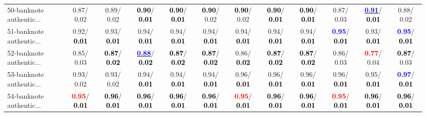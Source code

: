 \begin{table}[h]
\begin{center}
{\begin{tabular}{lc|c|c|c|c|c|c|c|c|c|c}
50-banknote authentic... &   0.87/  0.02 &   0.89/  0.02 & \textcolor{black}{\textbf{  0.90}}/\textcolor{black}{\textbf{  0.01}} & \textcolor{black}{\textbf{  0.90}}/\textcolor{black}{\textbf{  0.01}} & \textcolor{black}{\textbf{  0.90}}/  0.02 & \textcolor{black}{\textbf{  0.90}}/  0.02 & \textcolor{black}{\textbf{  0.90}}/\textcolor{black}{\textbf{  0.01}} & \textcolor{black}{\textbf{  0.90}}/\textcolor{black}{\textbf{  0.01}} &   0.87/  0.03 & \underline{\textcolor{blue}{\textbf{  0.91}}}/\textcolor{black}{\textbf{  0.01}} &   0.88/  0.02 \\
51-banknote authentic... &   0.92/\textcolor{black}{\textbf{  0.01}} &   0.93/\textcolor{black}{\textbf{  0.01}} &   0.94/\textcolor{black}{\textbf{  0.01}} &   0.94/\textcolor{black}{\textbf{  0.01}} &   0.94/\textcolor{black}{\textbf{  0.01}} &   0.94/\textcolor{black}{\textbf{  0.01}} &   0.94/\textcolor{black}{\textbf{  0.01}} &   0.94/\textcolor{black}{\textbf{  0.01}} & \textcolor{blue}{\textbf{  0.95}}/\textcolor{black}{\textbf{  0.01}} &   0.93/\textcolor{black}{\textbf{  0.01}} & \textcolor{blue}{\textbf{  0.95}}/\textcolor{black}{\textbf{  0.01}} \\
52-banknote authentic... &   0.85/  0.03 & \textcolor{black}{\textbf{  0.87}}/\textcolor{black}{\textbf{  0.02}} & \underline{\textcolor{blue}{\textbf{  0.88}}}/\textcolor{black}{\textbf{  0.02}} & \textcolor{black}{\textbf{  0.87}}/\textcolor{black}{\textbf{  0.02}} & \textcolor{black}{\textbf{  0.87}}/\textcolor{black}{\textbf{  0.02}} &   0.86/\textcolor{black}{\textbf{  0.02}} & \textcolor{black}{\textbf{  0.87}}/\textcolor{black}{\textbf{  0.02}} & \textcolor{black}{\textbf{  0.87}}/\textcolor{black}{\textbf{  0.02}} &   0.86/  0.03 & \textcolor{red}{\textbf{  0.77}}/  0.04 & \textcolor{black}{\textbf{  0.87}}/  0.03 \\
53-banknote authentic... &   0.93/  0.02 &   0.93/  0.02 &   0.94/\textcolor{black}{\textbf{  0.01}} &   0.94/\textcolor{black}{\textbf{  0.01}} &   0.94/\textcolor{black}{\textbf{  0.01}} &   0.96/\textcolor{black}{\textbf{  0.01}} &   0.96/\textcolor{black}{\textbf{  0.01}} &   0.96/\textcolor{black}{\textbf{  0.01}} &   0.96/\textcolor{black}{\textbf{  0.01}} &   0.95/\textcolor{black}{\textbf{  0.01}} & \textcolor{blue}{\textbf{  0.97}}/\textcolor{black}{\textbf{  0.01}} \\ \hline
54-banknote authentic... & \textcolor{red}{\textbf{  0.95}}/\textcolor{black}{\textbf{  0.01}} & \textcolor{black}{\textbf{  0.96}}/\textcolor{black}{\textbf{  0.01}} & \textcolor{black}{\textbf{  0.96}}/\textcolor{black}{\textbf{  0.01}} & \textcolor{black}{\textbf{  0.96}}/\textcolor{black}{\textbf{  0.01}} & \textcolor{black}{\textbf{  0.96}}/\textcolor{black}{\textbf{  0.01}} & \textcolor{red}{\textbf{  0.95}}/\textcolor{black}{\textbf{  0.01}} & \textcolor{black}{\textbf{  0.96}}/\textcolor{black}{\textbf{  0.01}} & \textcolor{black}{\textbf{  0.96}}/\textcolor{black}{\textbf{  0.01}} & \textcolor{red}{\textbf{  0.95}}/\textcolor{black}{\textbf{  0.01}} & \textcolor{black}{\textbf{  0.96}}/\textcolor{black}{\textbf{  0.01}} & \textcolor{black}{\textbf{  0.96}}/\textcolor{black}{\textbf{  0.01}} \\

\end{tabular}}
\end{center}
\end{table}
